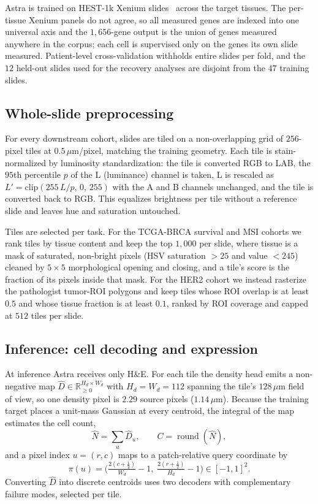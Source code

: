 \documentclass[11pt]{article}
\begin{document}
Astra is trained on HEST-1k Xenium slides~\cite{hest} across the target tissues.
The per-tissue Xenium panels do not agree, so all measured genes are indexed
into one universal axis and the $1{,}656$-gene output is the union of genes
measured anywhere in the corpus; each cell is supervised only on the genes its
own slide measured. Patient-level cross-validation withholds entire slides per
fold, and the $12$ held-out slides used for the recovery analyses are disjoint
from the $47$ training slides.

\subsection{Whole-slide preprocessing}
\label{met:preproc}

For every downstream cohort, slides are tiled on a non-overlapping grid of
$256$-pixel tiles at $0.5\,\mu$m/pixel, matching the training geometry. Each tile
is stain-normalized by luminosity standardization: the tile is converted RGB to
LAB, the $95$th percentile $p$ of the L (luminance) channel is taken, L is
rescaled as $L'=\mathrm{clip}(255\,L/p,\,0,\,255)$ with the A and B channels
unchanged, and the tile is converted back to RGB. This equalizes brightness per
tile without a reference slide and leaves hue and saturation untouched.

Tiles are selected per task. For the TCGA-BRCA survival and MSI cohorts we rank
tiles by tissue content and keep the top $1{,}000$ per slide, where tissue is a
mask of saturated, non-bright pixels (HSV saturation $>25$ and value $<245$)
cleaned by $5\times5$ morphological opening and closing, and a tile's score is
the fraction of its pixels inside that mask. For the HER2 cohort we instead
rasterize the pathologist tumor-ROI polygons and keep tiles whose ROI overlap is
at least $0.5$ and whose tissue fraction is at least $0.1$, ranked by ROI
coverage and capped at $512$ tiles per slide.

\subsection{Inference: cell decoding and expression}
\label{met:decoding}

At inference Astra receives only H\&E. For each tile the density head emits a
non-negative map $\hat D\in\mathbb{R}_{\ge0}^{H_d\times W_d}$ with
$H_d=W_d=112$ spanning the tile's $128\,\mu$m field of view, so one density
pixel is $2.29$ source pixels ($1.14\,\mu$m). Because the training target places
a unit-mass Gaussian at every centroid, the integral of the map estimates the
cell count,
\[
\hat N=\sum_{u}\hat D_u,\qquad C=\operatorname{round}(\hat N),
\]
and a pixel index $u=(r,c)$ maps to a patch-relative query coordinate by
\[
\pi(u)=\Big(\tfrac{2(c+\frac12)}{W_d}-1,\;\tfrac{2(r+\frac12)}{H_d}-1\Big)\in[-1,1]^2 .
\]
Converting $\hat D$ into discrete centroids uses two decoders with
complementary failure modes, selected per tile.
\end{document}
